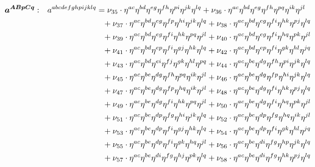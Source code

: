 \documentclass[a4paper,12pt, DIV=14, BCOR=5mm, twoside, headsepline]{scrbook}
\begin{document}
\begin{align}\label{LorentzArea2}
\begin{alignedat}{2}
\boldsymbol{a^{ABpCq}}&: \ \ \ & a^{abcdefghpijklq}  &= \nu_{35}\cdot\eta^{ac}\eta^{bd}\eta^{eg}\eta^{fh}\eta^{pi}\eta^{jk}\eta^{lq}+\nu_{36}\cdot\eta^{ac}\eta^{bd}\eta^{eg}\eta^{fh}\eta^{pq}\eta^{ik}\eta^{jl}\\
& & &\hphantom{=}
+\nu_{37}\cdot\eta^{ac}\eta^{bd}\eta^{eg}\eta^{fp}\eta^{hi}\eta^{jk}\eta^{lq}+\nu_{38}\cdot\eta^{ac}\eta^{bd}\eta^{eg}\eta^{fi}\eta^{hk}\eta^{pj}\eta^{lq}\\
& & &\hphantom{=}
+\nu_{39}\cdot\eta^{ac}\eta^{bd}\eta^{eg}\eta^{fi}\eta^{hk}\eta^{pq}\eta^{jl}+\nu_{40}\cdot\eta^{ac}\eta^{bd}\eta^{eg}\eta^{fi}\eta^{hq}\eta^{pk}\eta^{jl}\\
& & &\hphantom{=}
+\nu_{41}\cdot\eta^{ac}\eta^{bd}\eta^{ep}\eta^{fi}\eta^{gj}\eta^{hk}\eta^{lq}+\nu_{42}\cdot\eta^{ac}\eta^{bd}\eta^{ep}\eta^{fi}\eta^{gk}\eta^{hl}\eta^{jq}\\
& & &\hphantom{=}
+\nu_{43}\cdot\eta^{ac}\eta^{bd}\eta^{ei}\eta^{fj}\eta^{gk}\eta^{hl}\eta^{pq}+\nu_{44}\cdot\eta^{ac}\eta^{be}\eta^{dg}\eta^{fh}\eta^{pi}\eta^{jk}\eta^{lq}\\
& & &\hphantom{=}
+\nu_{45}\cdot\eta^{ac}\eta^{be}\eta^{dg}\eta^{fh}\eta^{pq}\eta^{ik}\eta^{jl}+\nu_{46}\cdot\eta^{ac}\eta^{be}\eta^{dg}\eta^{fp}\eta^{hi}\eta^{jk}\eta^{lq}\\
& & &\hphantom{=}
+\nu_{47}\cdot\eta^{ac}\eta^{be}\eta^{dg}\eta^{fp}\eta^{hq}\eta^{ik}\eta^{jl}+\nu_{48}\cdot\eta^{ac}\eta^{be}\eta^{dg}\eta^{fi}\eta^{hk}\eta^{pj}\eta^{lq}\\
& & &\hphantom{=}
+\nu_{49}\cdot\eta^{ac}\eta^{be}\eta^{dg}\eta^{fi}\eta^{hk}\eta^{pq}\eta^{jl}+\nu_{50}\cdot\eta^{ac}\eta^{be}\eta^{dg}\eta^{fi}\eta^{hq}\eta^{pk}\eta^{jl}\\
& & &\hphantom{=}
+\nu_{51}\cdot\eta^{ac}\eta^{be}\eta^{dp}\eta^{fg}\eta^{hi}\eta^{jk}\eta^{lq}+\nu_{52}\cdot\eta^{ac}\eta^{be}\eta^{dp}\eta^{fg}\eta^{hq}\eta^{ik}\eta^{jl}\\
& & &\hphantom{=}
+\nu_{53}\cdot\eta^{ac}\eta^{be}\eta^{dp}\eta^{fi}\eta^{gj}\eta^{hk}\eta^{lq}+\nu_{54}\cdot\eta^{ac}\eta^{be}\eta^{dp}\eta^{fi}\eta^{gk}\eta^{hl}\eta^{jq}\\
& & &\hphantom{=}
+\nu_{55}\cdot\eta^{ac}\eta^{be}\eta^{dp}\eta^{fi}\eta^{gk}\eta^{hq}\eta^{jl}+\nu_{56}\cdot\eta^{ac}\eta^{be}\eta^{di}\eta^{fg}\eta^{hp}\eta^{jk}\eta^{lq}\\
& & &\hphantom{=}
+\nu_{57}\cdot\eta^{ac}\eta^{be}\eta^{di}\eta^{fg}\eta^{hj}\eta^{pk}\eta^{lq}+\nu_{58}\cdot\eta^{ac}\eta^{be}\eta^{di}\eta^{fg}\eta^{hk}\eta^{pj}\eta^{lq}\\

\end{alignedat}
\end{align}
\end{document}
